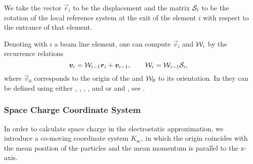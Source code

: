 We take the vector $\vec{r}_i$ to be the displacement and the matrix
$\mathcal{S}_i$ to be the rotation of the local reference system
at the exit of the element $i$ with respect to the entrance
of that element.

Denoting with $i$ a beam line element,
one can compute $\vec{v}_i$ and $\mathcal{W}_i$
by the recurrence relations
\begin{equation} \label{eq:surv}
\vec{v}_i = \matr{W}_{i-1}\vec{r}_i + \vec{v}_{i-1}, \qquad
\matr{W}_i = \matr{W}_{i-1}\matr{S}_i,
\end{equation}
where $\vec{v}_0$ corresponds to the origin of the  and $\mathcal{W}_0$ to its orientation. In \opalt they can be defined using either , , , ,  and  or  and , see .

\subsubsection{Space Charge Coordinate System}
In order to calculate space charge in the electrostatic approximation, we introduce a co-moving coordinate system $K_{\text{sc}}$, in which the origin coincides with the mean position of the particles and the mean momentum is parallel to the z-axis.


